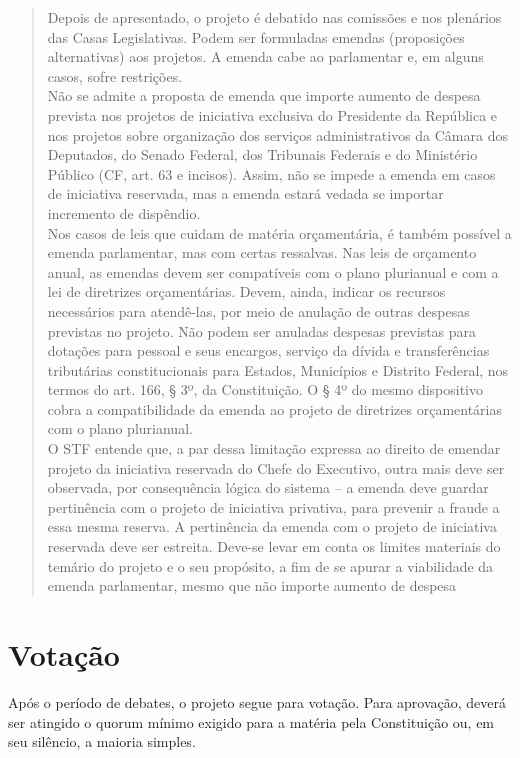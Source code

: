 \documentclass{article}
\begin{document}
\begin{quote}
    Depois de apresentado, o projeto é debatido nas comissões e nos plenários das Casas Legislativas. Podem ser formuladas emendas (proposições alternativas) aos projetos. A emenda cabe ao parlamentar e, em alguns casos, sofre restrições.\\
    Não se admite a proposta de emenda que importe aumento de despesa prevista nos projetos de iniciativa exclusiva do Presidente da República e nos projetos sobre organização dos serviços administrativos da Câmara dos Deputados, do Senado Federal, dos Tribunais Federais e do Ministério Público (CF, art. 63 e incisos). Assim, não se impede a emenda em casos de iniciativa reservada, mas a emenda estará vedada se importar incremento de dispêndio.\\
    Nos casos de leis que cuidam de matéria orçamentária, é também possível a emenda parlamentar, mas com certas ressalvas. Nas leis de orçamento anual, as emendas devem ser compatíveis com o plano plurianual e com a lei de diretrizes orçamentárias. Devem, ainda, indicar os recursos necessários para atendê-las, por meio de anulação de outras despesas previstas no projeto. Não podem ser anuladas despesas previstas para dotações para pessoal e seus encargos, serviço da dívida e transferências tributárias constitucionais para Estados, Municípios e Distrito Federal, nos termos do art. 166, § 3º, da Constituição. O § 4º do mesmo dispositivo cobra a compatibilidade da emenda ao projeto de diretrizes orçamentárias com o plano plurianual.\\
    O STF entende que, a par dessa limitação expressa ao direito de emendar projeto da iniciativa reservada do Chefe do Executivo, outra mais deve ser observada, por consequência lógica do sistema – a emenda deve guardar pertinência com o projeto de iniciativa privativa, para prevenir a fraude a essa mesma reserva. A pertinência da emenda com o projeto de iniciativa reservada deve ser estreita. Deve-se levar em conta os limites materiais do temário do projeto e o seu propósito, a fim de se apurar a viabilidade da emenda parlamentar, mesmo que não importe aumento de despesa \cite[p.~1060]{mendes_curso_2024}
\end{quote}

\section{Votação}

Após o período de debates, o projeto segue para votação. Para aprovação, deverá ser atingido o quorum mínimo exigido para a matéria pela Constituição ou, em seu silêncio, a maioria simples.
\end{document}
